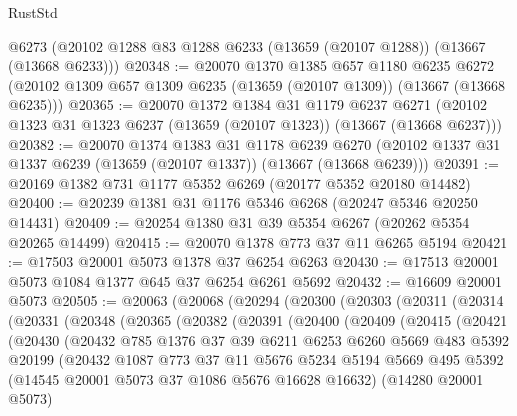\begin{lexlean}{RustStd}
\begin{coremodule}
    @6273
    (@20102 @1288 @83 @1288 @6233 (@13659 (@20107 @1288)) (@13667 (@13668 @6233)))
@20348 := @20070
    @1370
    @1385
    @657
    @1180
    @6235
    @6272
    (@20102 @1309 @657 @1309 @6235 (@13659 (@20107 @1309)) (@13667 (@13668 @6235)))
@20365 := @20070
    @1372
    @1384
    @31
    @1179
    @6237
    @6271
    (@20102 @1323 @31 @1323 @6237 (@13659 (@20107 @1323)) (@13667 (@13668 @6237)))
@20382 := @20070
    @1374
    @1383
    @31
    @1178
    @6239
    @6270
    (@20102 @1337 @31 @1337 @6239 (@13659 (@20107 @1337)) (@13667 (@13668 @6239)))
@20391 := @20169 @1382 @731 @1177 @5352 @6269 (@20177 @5352 @20180 @14482)
@20400 := @20239 @1381 @31 @1176 @5346 @6268 (@20247 @5346 @20250 @14431)
@20409 := @20254 @1380 @31 @39 @5354 @6267 (@20262 @5354 @20265 @14499)
@20415 := @20070 @1378 @773 @37 @11 @6265 @5194
@20421 := @17503 @20001 @5073 @1378 @37 @6254 @6263
@20430 := @17513 @20001 @5073 @1084 @1377 @645 @37 @6254 @6261 @5692
@20432 := @16609 @20001 @5073
@20505 := @20063
    (@20068
      (@20294
        (@20300
          (@20303
            (@20311
              (@20314
                (@20331
                  (@20348
                    (@20365
                      (@20382
                        (@20391
                          (@20400
                            (@20409
                              (@20415
                                (@20421
                                  (@20430
                                    (@20432
                                      @785
                                      @1376
                                      @37
                                      @39
                                      @6211
                                      @6253
                                      @6260
                                      @5669
                                      @483
                                      @5392
                                      @20199
                                      (@20432
                                        @1087
                                        @773
                                        @37
                                        @11
                                        @5676
                                        @5234
                                        @5194
                                        @5669
                                        @495
                                        @5392
                                        (@14545 @20001 @5073 @37 @1086 @5676 @16628 @16632)
                                        (@14280 @20001 @5073)

\end{coremodule}
\end{lexlean}
